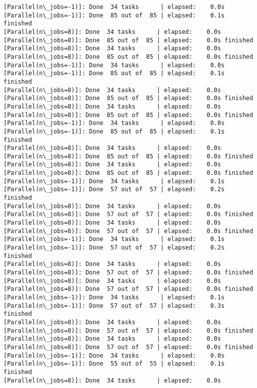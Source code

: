 \documentclass[11pt]{article}
\begin{document}
\begin{Verbatim}[commandchars=\\\{\}]
[Parallel(n\_jobs=-1)]: Done  34 tasks      | elapsed:    0.0s
[Parallel(n\_jobs=-1)]: Done  85 out of  85 | elapsed:    0.1s finished
[Parallel(n\_jobs=8)]: Done  34 tasks      | elapsed:    0.0s
[Parallel(n\_jobs=8)]: Done  85 out of  85 | elapsed:    0.0s finished
[Parallel(n\_jobs=8)]: Done  34 tasks      | elapsed:    0.0s
[Parallel(n\_jobs=8)]: Done  85 out of  85 | elapsed:    0.0s finished
[Parallel(n\_jobs=-1)]: Done  34 tasks      | elapsed:    0.0s
[Parallel(n\_jobs=-1)]: Done  85 out of  85 | elapsed:    0.1s finished
[Parallel(n\_jobs=8)]: Done  34 tasks      | elapsed:    0.0s
[Parallel(n\_jobs=8)]: Done  85 out of  85 | elapsed:    0.0s finished
[Parallel(n\_jobs=8)]: Done  34 tasks      | elapsed:    0.0s
[Parallel(n\_jobs=8)]: Done  85 out of  85 | elapsed:    0.0s finished
[Parallel(n\_jobs=-1)]: Done  34 tasks      | elapsed:    0.0s
[Parallel(n\_jobs=-1)]: Done  85 out of  85 | elapsed:    0.1s finished
[Parallel(n\_jobs=8)]: Done  34 tasks      | elapsed:    0.0s
[Parallel(n\_jobs=8)]: Done  85 out of  85 | elapsed:    0.0s finished
[Parallel(n\_jobs=8)]: Done  34 tasks      | elapsed:    0.0s
[Parallel(n\_jobs=8)]: Done  85 out of  85 | elapsed:    0.0s finished
[Parallel(n\_jobs=-1)]: Done  34 tasks      | elapsed:    0.1s
[Parallel(n\_jobs=-1)]: Done  57 out of  57 | elapsed:    0.2s finished
[Parallel(n\_jobs=8)]: Done  34 tasks      | elapsed:    0.0s
[Parallel(n\_jobs=8)]: Done  57 out of  57 | elapsed:    0.0s finished
[Parallel(n\_jobs=8)]: Done  34 tasks      | elapsed:    0.0s
[Parallel(n\_jobs=8)]: Done  57 out of  57 | elapsed:    0.0s finished
[Parallel(n\_jobs=-1)]: Done  34 tasks      | elapsed:    0.1s
[Parallel(n\_jobs=-1)]: Done  57 out of  57 | elapsed:    0.2s finished
[Parallel(n\_jobs=8)]: Done  34 tasks      | elapsed:    0.0s
[Parallel(n\_jobs=8)]: Done  57 out of  57 | elapsed:    0.0s finished
[Parallel(n\_jobs=8)]: Done  34 tasks      | elapsed:    0.0s
[Parallel(n\_jobs=8)]: Done  57 out of  57 | elapsed:    0.0s finished
[Parallel(n\_jobs=-1)]: Done  34 tasks      | elapsed:    0.1s
[Parallel(n\_jobs=-1)]: Done  57 out of  57 | elapsed:    0.3s finished
[Parallel(n\_jobs=8)]: Done  34 tasks      | elapsed:    0.0s
[Parallel(n\_jobs=8)]: Done  57 out of  57 | elapsed:    0.0s finished
[Parallel(n\_jobs=8)]: Done  34 tasks      | elapsed:    0.0s
[Parallel(n\_jobs=8)]: Done  57 out of  57 | elapsed:    0.0s finished
[Parallel(n\_jobs=-1)]: Done  34 tasks      | elapsed:    0.0s
[Parallel(n\_jobs=-1)]: Done  55 out of  55 | elapsed:    0.1s finished
[Parallel(n\_jobs=8)]: Done  34 tasks      | elapsed:    0.0s

\end{Verbatim}
\end{document}
